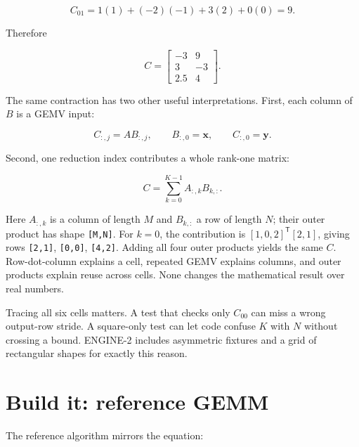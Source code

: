 \begin{equation}
C_{01}=1(1)+(-2)(-1)+3(2)+0(0)=9.
\end{equation}

Therefore

\begin{equation}
C=
\begin{bmatrix}
-3&9\\
3&-3\\
2.5&4
\end{bmatrix}.
\end{equation}


The same contraction has two other useful interpretations. First, each
column of \(B\) is a GEMV input:

\begin{equation}
C_{:,j}=A B_{:,j},\qquad B_{:,0}=\mathbf{x},\qquad C_{:,0}=\mathbf{y}.
\end{equation}

Second, one reduction index contributes a whole rank-one matrix:

\begin{equation}
C=\sum_{k=0}^{K-1} A_{:,k}B_{k,:}.
\end{equation}

Here \(A_{:,k}\) is a column of length \(M\) and \(B_{k,:}\) a row of
length \(N\); their outer product has shape \texttt{{[}M,N{]}}. For
\(k=0\), the contribution is \([1,0,2]^{\mathsf T}[2,1]\), giving rows
\texttt{{[}2,1{]}}, \texttt{{[}0,0{]}}, \texttt{{[}4,2{]}}. Adding all
four outer products yields the same \(C\). Row-dot-column explains a
cell, repeated GEMV explains columns, and outer products explain reuse
across cells. None changes the mathematical result over real numbers.

Tracing all six cells matters. A test that checks only \(C_{00}\) can
miss a wrong output-row stride. A square-only test can let code confuse
\(K\) with \(N\) without crossing a bound. ENGINE-2 includes asymmetric
fixtures and a grid of rectangular shapes for exactly this reason.

\section{Build it: reference GEMM}\label{build-it-reference-gemm}

The reference algorithm mirrors the equation:

